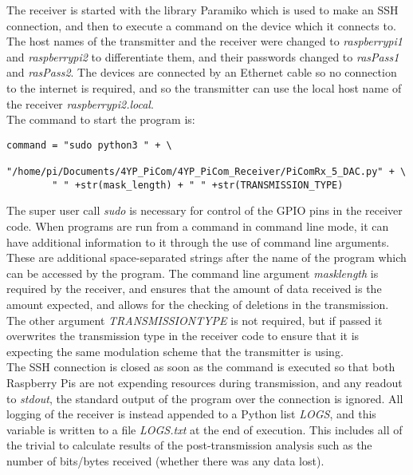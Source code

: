 \documentclass[../main.tex]{subfiles}
\begin{document}
The receiver is started with the library Paramiko \cite{lib_Paramiko} which is used to make an SSH connection, and then to execute a command on the device which it connects to.
The host names of the transmitter and the receiver were changed to \textit{raspberrypi1} and \textit{raspberrypi2} to differentiate them, and their passwords changed to \textit{rasPass1} and \textit{rasPass2}.
The devices are connected by an Ethernet cable so no connection to the internet is required, and so the transmitter can use the local host name of the receiver \textit{raspberrypi2.local}.\\

The command to start the program is:

\begin{lstlisting}[caption=Command Line to Start the Receiver]
	command = "sudo python3 " + \
		"/home/pi/Documents/4YP_PiCom/4YP_PiCom_Receiver/PiComRx_5_DAC.py" + \
		" " +str(mask_length) + " " +str(TRANSMISSION_TYPE)
\end{lstlisting}

The super user call \textit{sudo} is necessary for control of the GPIO pins in the receiver code.
When programs are run from a command in command line mode, it can have additional information to it through the use of command line arguments.
These are additional space-separated strings after the name of the program which can be accessed by the program.
The command line argument \textit{mask\textunderscore length} is required by the receiver, and ensures that the amount of data received is the amount expected, and allows for the checking of deletions in the transmission.
The other argument \textit{TRANSMISSION\textunderscore TYPE} is not required, but if passed it overwrites the transmission type in the receiver code to ensure that it is expecting the same modulation scheme that the transmitter is using.\\

The SSH connection is closed as soon as the command is executed so that both Raspberry Pis are not expending resources during transmission, and any readout to \textit{stdout}, the standard output of the program over the connection is ignored.
All logging of the receiver is instead appended to a Python list \textit{LOGS}, and this variable is written to a file \textit{LOGS.txt} at the end of execution.
This includes all of the trivial to calculate results of the post-transmission analysis such as the number of bits/bytes received (whether there was any data lost).
\end{document}
